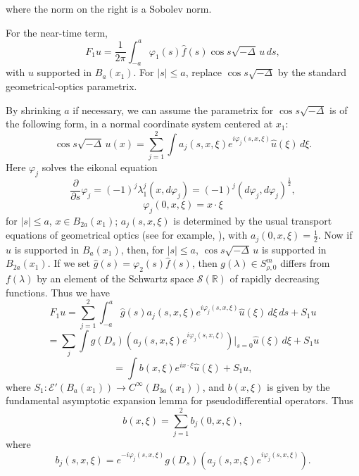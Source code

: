 where the norm on the right is a Sobolev norm.

For the near-time term,
\begin{equation}\tag{3.31}
F_1u=\frac{1}{2\pi}\int_{-a}^{a}\varphi_1(s)\hat f(s)\cos s\sqrt{-\Delta}\,u\,ds,
\end{equation}
with $u$ supported in $B_a(x_1)$. For $|s|\le a$, replace
$\cos s\sqrt{-\Delta}$ by the standard geometrical-optics parametrix.

By shrinking $a$ if necessary, we can assume the parametrix for $\cos s\sqrt{-\Delta}$ is of the following form, in a normal coordinate system centered at $x_1$:
\begin{equation}\tag{3.32}
\cos s\sqrt{-\Delta}\,u(x)=\sum_{j=1}^{2}\int a_j(s,x,\xi)e^{i\varphi_j(s,x,\xi)}\hat u(\xi)\,d\xi.
\end{equation}
Here $\varphi_j$ solves the eikonal equation
\begin{equation}\tag{3.33}
\frac{\partial}{\partial s}\varphi_j = (-1)^j\lambda_1^j(x,d\varphi_j)=(-1)^j(d\varphi_j,d\varphi_j)^{\frac12},
\end{equation}
\begin{equation}\tag{3.34}
\varphi_j(0,x,\xi)=x\cdot \xi
\end{equation}
for $|s|\le a$, $x\in B_{2a}(x_1)$; $a_j(s,x,\xi)$ is determined by the usual transport equations of geometrical optics (see for example, \cite[Chapter~VIII]{cgt-taylor-pdo}), with $a_j(0,x,\xi)=\frac12$. Now if $u$ is supported in $B_a(x_1)$, then, for $|s|\le a$, $\cos s\sqrt{-\Delta}\,u$ is supported in $B_{2a}(x_1)$. If we set $\hat g(s)=\varphi_2(s)\hat f(s)$, then $g(\lambda)\in S^{m}_{\rho,0}$ differs from $f(\lambda)$ by an element of the Schwartz space $\mathcal S(\mathbb R)$ of rapidly decreasing functions. Thus we have
\begin{equation*}
F_1u=\sum_{j=1}^{2}\int_{-a}^{a}\hat g(s)a_j(s,x,\xi)e^{i\varphi_j(s,x,\xi)}\hat u(\xi)\,d\xi\,ds+S_1u
\end{equation*}
\begin{equation}\tag{3.35}
=\sum_j\int g(D_s)\!\left(a_j(s,x,\xi)e^{i\varphi_j(s,x,\xi)}\right)\Big|_{s=0}\hat u(\xi)\,d\xi+S_1u
\end{equation}
\begin{equation*}
=\int b(x,\xi)e^{ix\cdot \xi}\hat u(\xi)+S_1u,
\end{equation*}
where $S_1:\mathcal E'(B_a(x_1))\to C^\infty(B_{3a}(x_1))$, and $b(x,\xi)$ is given by the fundamental asymptotic expansion lemma for pseudodifferential operators. Thus
\begin{equation}\tag{3.36}
b(x,\xi)=\sum_{j=1}^{2}b_j(0,x,\xi),
\end{equation}
where
\begin{equation}\tag{3.37}
b_j(s,x,\xi)=e^{-i\varphi_j(s,x,\xi)}g(D_s)\!\left(a_j(s,x,\xi)e^{i\varphi_j(s,x,\xi)}\right).
\end{equation}

